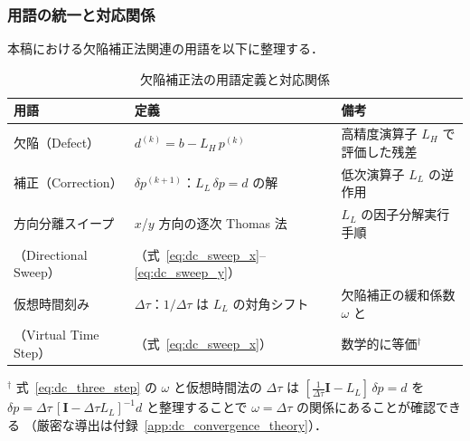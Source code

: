 \subsubsection{用語の統一と対応関係}
\label{sec:dc_terminology}

本稿における欠陥補正法関連の用語を以下に整理する．

\begin{table}[htbp]
\centering
\small
\caption{欠陥補正法の用語定義と対応関係}
\label{tab:dc_terminology}
\renewcommand{\arraystretch}{1.3}
\begin{tabular}{lll}
\toprule
用語 & 定義 & 備考 \\
\midrule
欠陥（Defect） & $d^{(k)} = b - L_H\,p^{(k)}$ &
  高精度演算子 $L_H$ で評価した残差 \\
補正（Correction） & $\delta p^{(k+1)}$：$L_L\,\delta p = d$ の解 &
  低次演算子 $L_L$ の逆作用 \\
方向分離スイープ & $x$/$y$ 方向の逐次 Thomas 法 &
  $L_L$ の因子分解実行手順 \\
  （Directional Sweep） & （式~\eqref{eq:dc_sweep_x}--\eqref{eq:dc_sweep_y}） & \\
仮想時間刻み & $\Delta\tau$：$1/\Delta\tau$ は $L_L$ の対角シフト &
  欠陥補正の緩和係数 $\omega$ と \\
  （Virtual Time Step） & （式~\eqref{eq:dc_sweep_x}） &
  数学的に等価$^{\dagger}$ \\
\bottomrule
\end{tabular}

\smallskip
\noindent $^{\dagger}$
式~\eqref{eq:dc_three_step} の $\omega$ と仮想時間法の $\Delta\tau$ は
$[\frac{1}{\Delta\tau}\mathbf{I} - L_L]\,\delta p = d$ を $\delta p = \Delta\tau\,[\mathbf{I} - \Delta\tau L_L]^{-1} d$ と整理することで
$\omega = \Delta\tau$ の関係にあることが確認できる
（厳密な導出は付録~\ref{app:dc_convergence_theory}）．
\end{table}
